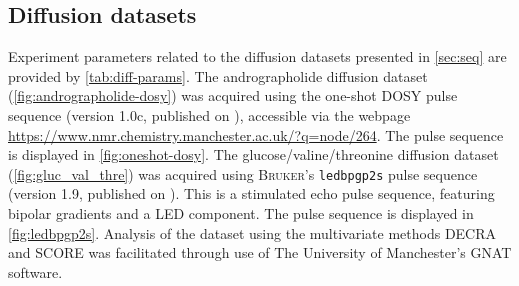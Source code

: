 \subsection{Diffusion datasets}

Experiment parameters related to the diffusion datasets presented in
\cref{sec:seq} are provided by \cref{tab:diff-params}.
The andrographolide diffusion dataset (\cref{fig:andrographolide-dosy})
was acquired using the one-shot \ac{DOSY} pulse sequence\cite{Pelta2002}
(version 1.0c, published on ), accessible via the webpage
\url{https://www.nmr.chemistry.manchester.ac.uk/?q=node/264}. The pulse
sequence is displayed in \cref{fig:oneshot-dosy}.
The glucose/valine/threonine diffusion dataset (\cref{fig:gluc_val_thre})
was acquired using \textsc{Bruker}'s \texttt{ledbpgp2s} pulse sequence (version 1.9, published on
). This is a stimulated echo pulse sequence, featuring
bipolar gradients and a \ac{LED} component\cite{Wu1995}. The pulse sequence is
displayed in \cref{fig:ledbpgp2s}.
Analysis of the dataset using the multivariate methods \ac{DECRA} and
\ac{SCORE} was facilitated through use of The University of Manchester's
\ac{GNAT} software\cite{Castanar2018}.


